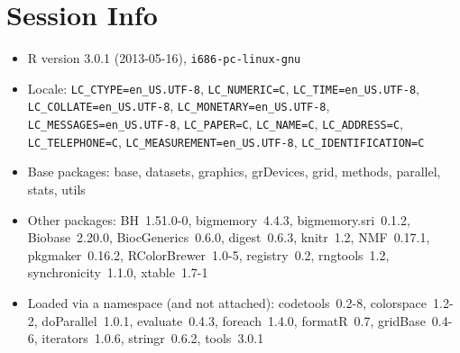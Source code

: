 \documentclass[a4paper]{article}\usepackage{graphicx, color}
\begin{document}
\section{Session Info}
\begin{itemize}\raggedright
  \item R version 3.0.1 (2013-05-16), \verb|i686-pc-linux-gnu|
  \item Locale: \verb|LC_CTYPE=en_US.UTF-8|, \verb|LC_NUMERIC=C|, \verb|LC_TIME=en_US.UTF-8|, \verb|LC_COLLATE=en_US.UTF-8|, \verb|LC_MONETARY=en_US.UTF-8|, \verb|LC_MESSAGES=en_US.UTF-8|, \verb|LC_PAPER=C|, \verb|LC_NAME=C|, \verb|LC_ADDRESS=C|, \verb|LC_TELEPHONE=C|, \verb|LC_MEASUREMENT=en_US.UTF-8|, \verb|LC_IDENTIFICATION=C|
  \item Base packages: base, datasets, graphics,
    grDevices, grid, methods, parallel, stats, utils
  \item Other packages: BH~1.51.0-0, bigmemory~4.4.3,
    bigmemory.sri~0.1.2, Biobase~2.20.0,
    BiocGenerics~0.6.0, digest~0.6.3, knitr~1.2,
    NMF~0.17.1, pkgmaker~0.16.2, RColorBrewer~1.0-5,
    registry~0.2, rngtools~1.2, synchronicity~1.1.0,
    xtable~1.7-1
  \item Loaded via a namespace (and not attached):
    codetools~0.2-8, colorspace~1.2-2,
    doParallel~1.0.1, evaluate~0.4.3, foreach~1.4.0,
    formatR~0.7, gridBase~0.4-6, iterators~1.0.6,
    stringr~0.6.2, tools~3.0.1
\end{itemize}



\printbibliography[heading=bibintoc]
\end{document}
